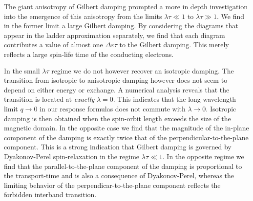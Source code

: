 The giant anisotropy of Gilbert damping prompted a more in depth investigation into the emergence of this anisotropy from the limits $\lambda\tau\ll1$ to $\lambda\tau\gg1$. We find in the former limit a large Gilbert damping. By considering the diagrams that appear in the ladder approximation separately, we find that each diagram contributes a value of almost one $\Delta \varepsilon\tau$ to the Gilbert damping. This merely reflects a large spin-life time of the conducting electrons.

In the small $\lambda\tau$ regime we do not however recover an isotropic damping. The transition from isotropic to anisotropic damping however does not seem to depend on either energy or exchange. A numerical analysis reveals that the transition is located at \emph{exactly} $\lambda=0$. This indicates that the long wavelength limit $q\rightarrow0$ in our response formulas does not commute with $\lambda\rightarrow0$. Isotropic damping is then obtained when the spin-orbit length exceeds the size of the magnetic domain. In the opposite case we find that the magnitude of the in-plane component of the damping is exactly twice that of the perpendicular-to-the-plane component. This is a strong indication that Gilbert damping is governed by Dyakonov-Perel spin-relaxation
in the regime $\lambda\tau\ll1$. In the opposite regime we find that 
the parallel-to-the-plane component of the damping is proportional to the transport-time and is also a consequence of Dyakonov-Perel, whereas the limiting behavior of the perpendicar-to-the-plane component reflects the forbidden interband transition.


